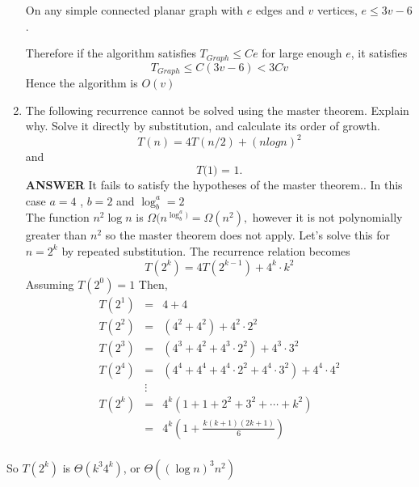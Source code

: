 \documentclass{article}
\begin{document}
\begin{enumerate}
On any simple connected planar graph with $e$ edges and $v$
vertices, $ e \le 3 v -6$.

Therefore if the algorithm satisfies $T_{Graph} \le C e$ for large
enough $e$, it satisfies
$$
T_{Graph} \le C ( 3 v -6 ) < 3 C v
$$
Hence the algorithm is $O( v ) $



\item
The following recurrence cannot be solved using the master
theorem. Explain why. Solve it directly by substitution, and
calculate its order of growth.
\[
T(n) = 4T(n/2) + (nlogn)^2 \]
and
\[
\textit{T(1) = 1.}
\]
\vskip 10pt  \textbf{ANSWER} It fails to satisfy the hypotheses of
the master theorem.. In this case $a= 4$ , $b =2$ and $\log_b^a =
2$\\
The function $n^2 \log n$ is $\Omega (n^{\log_b^a)} = \Omega
(n^2),$ however it is not polynomially greater than $n^2$ so the
master theorem does not apply. Let's solve this for $n = 2^k$ by
repeated substitution. The recurrence relation becomes
\[
T(2^k) = 4 T(2^{k-1}) + 4^k \cdot k^2
\]
Assuming $T(2^0) = 1$ Then,
\begin{eqnarray*}
T(2^1) & = & 4 + 4 \\
T(2^2) & = & (4^2 + 4^2) + 4^2 \cdot 2^2 \\
T(2^3) & = &  (4^3 + 4^2 + 4^3 \cdot 2^2) + 4^3 \cdot 3^2 \\
T(2^4) & = &  (4^4 + 4^4 + 4^4 \cdot 2^2 + 4^4 \cdot 3^2 ) + 4^4 \cdot 4^2 \\
& \vdots &   \\
T(2^k) & = &  4^k ( 1 +  1 + 2^2 + 3^2  + \cdots + k^2 ) \\
       & = &  4^k ( 1 +  \frac{k (k+1) (2k+1)}{6} ) \\
\end{eqnarray*}

\end{enumerate}
So $T(2^k)$ is $\Theta ( k^3 4^k ) $, or $\Theta( (\log n)^3 n^2
)$
\end{document}
